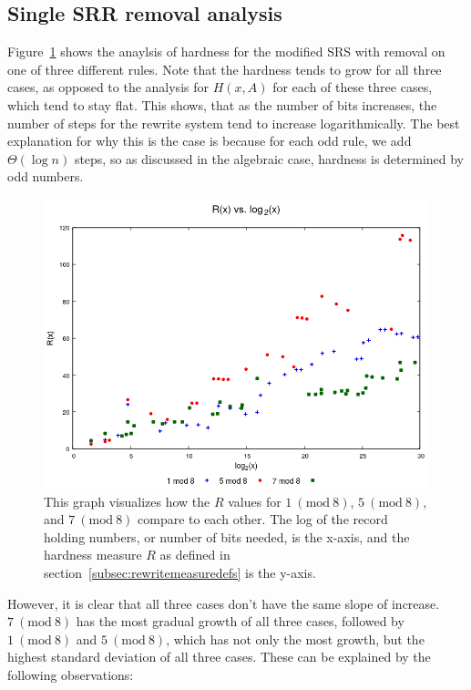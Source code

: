 \documentclass[12pt]{article}
\newcommand{\Mod}[1]{\ (\mathrm{mod}\ #1)}
\theoremstyle{definition}
\begin{document}
\subsection{Single SRR removal analysis} \label{subsec:rewritehardness}
Figure~\ref{fig:rvslog} shows the anaylsis of hardness for the modified SRS with removal on one of three different rules. Note that the hardness tends to grow for all three cases, as opposed to the analysis for $H(x,A)$ for each of these three cases, which tend to stay flat. This shows, that as the number of bits increases, the number of steps for the rewrite system tend to increase logarithmically. The best explanation for why this is the case is because for each odd rule, we add $\Theta(\log{n})$ steps, so as discussed in the algebraic case, hardness is determined by odd numbers.
\begin{figure}
    \centering
    \includegraphics[scale=0.75]{ModAvoidanceAnalysisPics/R_vs_log.png}
    \caption{This graph visualizes how the $R$ values for $1 \Mod{8}$, $5 \Mod{8}$, and $7 \Mod{8}$ compare to each other. The log of the record holding numbers, or number of bits needed, is the x-axis, and the hardness measure $R$ as defined in section~\ref{subsec:rewritemeasuredefs} is the y-axis.}
    \label{fig:rvslog}
\end{figure}
However, it is clear that all three cases don't have the same slope of increase. $7 \Mod{8}$ has the most gradual growth of all three cases, followed by $1 \Mod{8}$ and $5 \Mod{8}$, which has not only the most growth, but the highest standard deviation of all three cases. These can be explained by the following observations:
\end{document}
